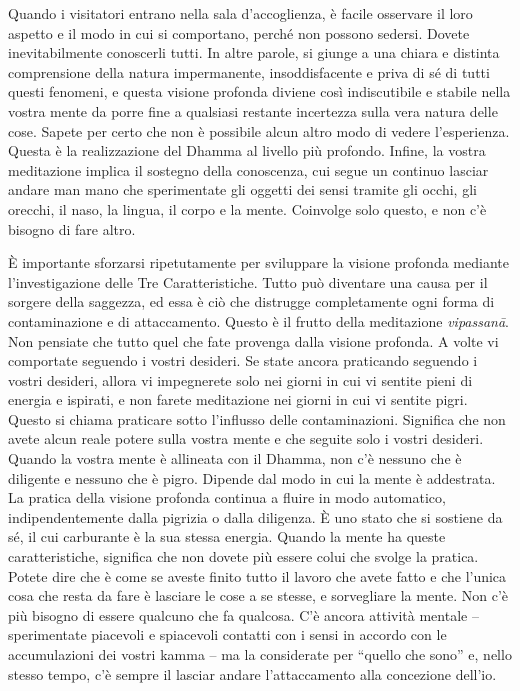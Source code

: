 Quando i visitatori entrano nella sala d'accoglienza, è facile osservare
il loro aspetto e il modo in cui si comportano, perché non possono
sedersi. Dovete inevitabilmente conoscerli tutti. In altre parole, si
giunge a una chiara e distinta comprensione della natura impermanente,
insoddisfacente e priva di sé di tutti questi fenomeni, e questa visione
profonda diviene così indiscutibile e stabile nella vostra mente da
porre fine a qualsiasi restante incertezza sulla vera natura delle cose.
Sapete per certo che non è possibile alcun altro modo di vedere
l'esperienza. Questa è la realizzazione del Dhamma al livello più
profondo. Infine, la vostra meditazione implica il sostegno della
conoscenza, cui segue un continuo lasciar andare man mano che
sperimentate gli oggetti dei sensi tramite gli occhi, gli orecchi, il
naso, la lingua, il corpo e la mente. Coinvolge solo questo, e non c'è
bisogno di fare altro.

È importante sforzarsi ripetutamente per sviluppare la visione profonda
mediante l'investigazione delle Tre Caratteristiche. Tutto può diventare
una causa per il sorgere della saggezza, ed essa è ciò che distrugge
completamente ogni forma di contaminazione e di attaccamento. Questo è
il frutto della meditazione \emph{vipassanā}. Non pensiate che tutto
quel che fate provenga dalla visione profonda. A volte vi comportate
seguendo i vostri desideri. Se state ancora praticando seguendo i vostri
desideri, allora vi impegnerete solo nei giorni in cui vi sentite pieni
di energia e ispirati, e non farete meditazione nei giorni in cui vi
sentite pigri. Questo si chiama praticare sotto l'influsso delle
contaminazioni. Significa che non avete alcun reale potere sulla vostra
mente e che seguite solo i vostri desideri. Quando la vostra mente è
allineata con il Dhamma, non c'è nessuno che è diligente e nessuno che è
pigro. Dipende dal modo in cui la mente è addestrata. La pratica della
visione profonda continua a fluire in modo automatico, indipendentemente
dalla pigrizia o dalla diligenza. È uno stato che si sostiene da sé, il
cui carburante è la sua stessa energia. Quando la mente ha queste
caratteristiche, significa che non dovete più essere colui che svolge la
pratica. Potete dire che è come se aveste finito tutto il lavoro che
avete fatto e che l'unica cosa che resta da fare è lasciare le cose a se
stesse, e sorvegliare la mente. Non c'è più bisogno di essere qualcuno
che fa qualcosa. C'è ancora attività mentale -- sperimentate piacevoli e
spiacevoli contatti con i sensi in accordo con le accumulazioni dei
vostri kamma -- ma la considerate per ``quello che sono'' e,
nello stesso tempo, c'è sempre il lasciar andare l'attaccamento alla
concezione dell'io.

